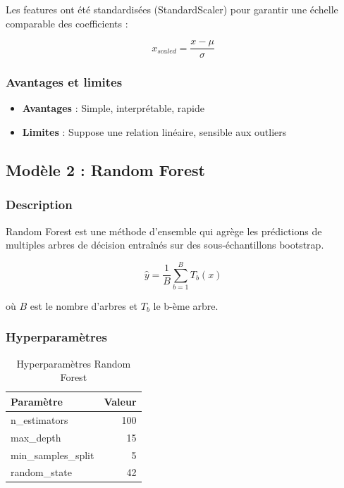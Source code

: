 \documentclass[12pt,a4paper]{article}
\begin{document}
Les features ont été standardisées (StandardScaler) pour garantir une échelle comparable des coefficients :

\begin{equation}
x_{scaled} = \frac{x - \mu}{\sigma}
\end{equation}

\subsubsection{Avantages et limites}

\begin{itemize}
    \item \textbf{Avantages} : Simple, interprétable, rapide
    \item \textbf{Limites} : Suppose une relation linéaire, sensible aux outliers
\end{itemize}

\subsection{Modèle 2 : Random Forest}

\subsubsection{Description}

Random Forest est une méthode d'ensemble qui agrège les prédictions de multiples arbres de décision entraînés sur des sous-échantillons bootstrap.

\begin{equation}
\hat{y} = \frac{1}{B}\sum_{b=1}^{B} T_b(x)
\end{equation}

où $B$ est le nombre d'arbres et $T_b$ le b-ème arbre.

\subsubsection{Hyperparamètres}

\begin{table}[H]
\centering
\caption{Hyperparamètres Random Forest}
\begin{tabular}{lr}
\toprule
\textbf{Paramètre} & \textbf{Valeur} \\
\midrule
n\_estimators & 100 \\
max\_depth & 15 \\
min\_samples\_split & 5 \\
random\_state & 42 \\
\bottomrule
\end{tabular}
\end{table}
\end{document}
